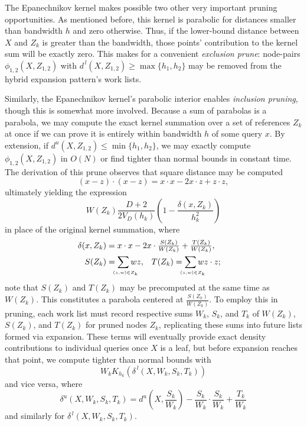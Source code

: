 \documentclass[twoside,leqno,twocolumn]{article}
\newcommand{\lo}[1]{#1^{\,l}}
\newcommand{\hi}[1]{#1^u}
\newcommand{\leftlim}[1]{\lefteqn{\scriptscriptstyle #1}}
\begin{document}
The Epanechnikov kernel makes possible two other very important
pruning opportunities.  As mentioned before, this kernel is parabolic
for distances smaller than bandwidth $h$ and zero otherwise.  Thus, if
the lower-bound distance between $X$ and $Z_k$ is greater than the
bandwidth, those points' contribution to the kernel sum will be
exactly zero.  This makes for a convenient {\em exclusion prune}:
node-pairs $\phi_{1,2}(X,Z_{1,2})$ with $\lo{d}(X,Z_{1,2}) \geq
\max\{h_1,h_2\}$ may be removed from the hybrid expansion pattern's
work lists.

Similarly, the Epanechnikov kernel's parabolic interior enables {\em
inclusion pruning}, though this is somewhat more involved.  Because a
sum of parabolas is a parabola, we may compute the exact kernel
summation over a set of references $Z_k$ at once if we can prove it is
entirely within bandwidth $h$ of some query $x$.  By extension, if
$\hi{d}(X,Z_{1,2}) \leq \min\{h_1,h_2\}$, we may exactly compute
$\phi_{1,2}(X,Z_{1,2})$ in $O(N)$ or find tighter than normal bounds
in constant time.  The derivation of this prune observes that square
distance may be computed
\begin{equation}
  (x - z) \cdot (x - z) = x \cdot x - 2 x \cdot z + z \cdot z ,
\end{equation}
ultimately yielding the expression
\begin{equation}
  W(Z_k) \frac{D + 2}{2 V_D(h_k)} \left( 1 - \frac{\delta(x,Z_k)}{h_k^2} \right)
\end{equation}
in place of the original kernel summation, where
\begin{align}
  \delta(x,Z_k) & = \lefteqn{\textstyle x \cdot x - 2x \cdot \frac{S(Z_k)}{W(Z_k)} + \frac{T(Z_k)}{W(Z_k)} ,} \\
  S(Z_k) & = \sum_{\leftlim{(z,w) \in Z_k}} w z , & T(Z_k) & = \sum_{\leftlim{(z,w) \in Z_k}} w z \cdot z ;
\end{align}
note that $S(Z_k)$ and $T(Z_k)$ may be precomputed at the same time as
$W(Z_k)$.  This constitutes a parabola centered at
$\frac{S(Z_k)}{W(Z_k)}$.  To employ this in pruning, each work list
must record respective sums $W_k$, $S_k$, and $T_k$ of $W(Z_k)$,
$S(Z_k)$, and $T(Z_k)$ for pruned nodes $Z_k$, replicating these sums
into future lists formed via expansion.  These terms will eventually
provide exact density contributions to individual queries once $X$ is
a leaf, but before expansion reaches that point, we compute tighter
than normal bounds with
\begin{equation}
  W_k K_{h_k}(\lo{\delta}(X,W_k,S_k,T_k))
\end{equation}
and vice versa, where
\begin{equation}
  \textstyle \hi{\delta}(X,W_k,S_k,T_k) = \hi{d} \! \left( X,\frac{S_k}{W_k} \right) - \frac{S_k}{W_k} \cdot \frac{S_k}{W_k} + \frac{T_k}{W_k}
\end{equation}
and similarly for $\lo{\delta}(X,W_k,S_k,T_k)$.
\end{document}
